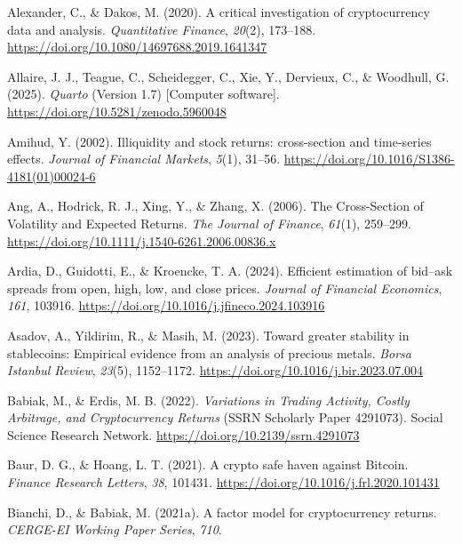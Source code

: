 \documentclass[
  12pt,
  a4paper,
  openany]{scrbook}
\newlength{\cslhangindent}
\newenvironment{CSLReferences}[2] %
 {\begin{list}{}{%
  \setlength{\itemindent}{0pt}
  \setlength{\leftmargin}{0pt}
  \setlength{\parsep}{0pt}
  \ifodd #1
   \setlength{\leftmargin}{\cslhangindent}
   \setlength{\itemindent}{-1\cslhangindent}
  \fi
  \setlength{\itemsep}{#2\baselineskip}}}
 {\end{list}}
\begin{document}
\label{refs}
\begin{CSLReferences}{1}{0}
Alexander, C., \& Dakos, M. (2020). A critical investigation of
cryptocurrency data and analysis. \emph{Quantitative Finance},
\emph{20}(2), 173--188.
\url{https://doi.org/10.1080/14697688.2019.1641347}

Allaire, J. J., Teague, C., Scheidegger, C., Xie, Y., Dervieux, C., \&
Woodhull, G. (2025). \emph{{Quarto}} (Version 1.7) {[}Computer
software{]}. \url{https://doi.org/10.5281/zenodo.5960048}

Amihud, Y. (2002). Illiquidity and stock returns: cross-section and
time-series effects. \emph{Journal of Financial Markets}, \emph{5}(1),
31--56. \url{https://doi.org/10.1016/S1386-4181(01)00024-6}

Ang, A., Hodrick, R. J., Xing, Y., \& Zhang, X. (2006). The
Cross-Section of Volatility and Expected Returns. \emph{The Journal of
Finance}, \emph{61}(1), 259--299.
\url{https://doi.org/10.1111/j.1540-6261.2006.00836.x}

Ardia, D., Guidotti, E., \& Kroencke, T. A. (2024). Efficient estimation
of bid--ask spreads from open, high, low, and close prices.
\emph{Journal of Financial Economics}, \emph{161}, 103916.
\url{https://doi.org/10.1016/j.jfineco.2024.103916}

Asadov, A., Yildirim, R., \& Masih, M. (2023). Toward greater stability
in stablecoins: Empirical evidence from an analysis of precious metals.
\emph{Borsa Istanbul Review}, \emph{23}(5), 1152--1172.
\url{https://doi.org/10.1016/j.bir.2023.07.004}

Babiak, M., \& Erdis, M. B. (2022). \emph{Variations in Trading
Activity, Costly Arbitrage, and Cryptocurrency Returns} (SSRN Scholarly
Paper 4291073). Social Science Research Network.
\url{https://doi.org/10.2139/ssrn.4291073}

Baur, D. G., \& Hoang, L. T. (2021). A crypto safe haven against
Bitcoin. \emph{Finance Research Letters}, \emph{38}, 101431.
\url{https://doi.org/10.1016/j.frl.2020.101431}

Bianchi, D., \& Babiak, M. (2021a). A factor model for cryptocurrency
returns. \emph{CERGE-EI Working Paper Series}, \emph{710}.


\end{CSLReferences}
\end{document}

